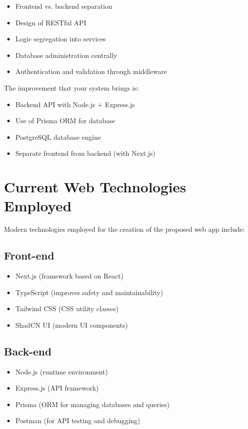 \begin{itemize}
    \item Frontend vs. backend separation
    \item Design of RESTful API
    \item Logic segregation into services
    \item Database administration centrally
    \item Authentication and validation through middleware
\end{itemize}

The improvement that your system brings is:

\begin{itemize}
    \item Backend API with Node.js + Express.js
    \item Use of Prisma ORM for database
    \item PostgreSQL database engine
    \item Separate frontend from backend (with Next.js)
\end{itemize}

\section{Current Web Technologies Employed}

Modern technologies employed for the creation of the proposed web app include:

\subsection*{Front-end}

\begin{itemize}
    \item Next.js (framework based on React)
    \item TypeScript (improves safety and maintainability)
    \item Tailwind CSS (CSS utility classes)
    \item ShadCN UI (modern UI components)
\end{itemize}

\subsection*{Back-end}

\begin{itemize}
    \item Node.js (runtime environment)
    \item Express.js (API framework)
    \item Prisma (ORM for managing databases and queries)
    \item Postman (for API testing and debugging)
\end{itemize}


